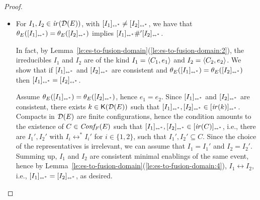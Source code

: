 \begin{proof}
\begin{itemize}
  \smallskip
  
  \item For  $I_1, I_2 \in \ir{\dom{{E}}}$, with
    $\eqclassir{I_1} \neq \eqclassir{I_2}$, we have that
    $\theta_{{E}}(\eqclassir{I_1}) =
    \theta_{{E}}(\eqclassir{I_2})$
    implies $\eqclassir{I_1} \#' \eqclassir{I_2}$.
    
    In fact, by
    Lemma~\ref{le:es-to-fusion-domain}(\ref{le:es-to-fusion-domain:2}),
    the irreducibles $I_1$ and $I_2$ are of the kind
    $I_1 = \esir{C_1}{e_1}$ and $I_2 = \esir{C_2}{e_2}$. We show that
    if $\eqclassir{I_1}$ and $\eqclassir{I_2}$ are consistent and
    $\theta_{{E}}(\eqclassir{I_1}) = \theta_{{E}}(\eqclassir{I_2})$
    then $\eqclassir{I_1} = \eqclassir{I_2}$.

    Assume
    $\theta_{{E}}(\eqclassir{I_1}) =
    \theta_{{E}}(\eqclassir{I_2})$,
    hence $e_1=e_2$. Since $\eqclassir{I_1}$ and
    $\eqclassir{I_2}$ are consistent, there exists
    $k \in \compact{\dom{{E}}}$ such that
    $\eqclassir{I_1}, \eqclassir{I_2} \in \eqclassir{\ir{k}}$.  
    Compacts in $\dom{{E}}$ are finite configurations, hence the condition
    amounts to the existence of $C \in \conff{{E}}$ such that
    $\eqclassir{I_1}, \eqclassir{I_2} \in \eqclassir{\ir{C}}$, i.e.,
    there  are $I_1', I_2'$ with $I_i \leftrightarrow^* I_i'$ for
    $i \in \{ 1,2\}$, such that $I_1', I_2' \subseteq C$. Since the
    choice of the representatives is irrelevant, we can assume
    that $I_1 = I_1'$ and $I_2 = I_2'$. Summing up, $I_1$ and $I_2$
    are consistent minimal enablings of the same event, hence by
    Lemma~\ref{le:es-to-fusion-domain}(\ref{le:es-to-fusion-domain:4}), $I_1 \leftrightarrow I_2$,
    i.e., $\eqclassir{I_1} = \eqclassir{I_2}$, as desired.

    \smallskip



\end{itemize}
\end{proof}
